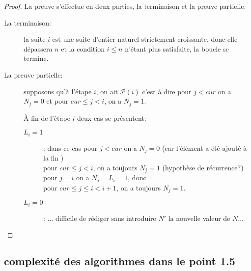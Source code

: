 \documentclass[10pt,french]{article}
\theoremstyle{plain}
\newtheorem*{proof}{Preuve}
\begin{document}
\begin{proof}
    La preuve s'effectue en deux parties, la terminaison et la preuve partielle.
    \begin{description}
        \item[La terminaison:]     la suite $i$ est une suite d'entier naturel strictement croissante, donc elle dépassera $n$ et la condition $i \leqslant n$   n'étant plus satisfaite, la boucle se termine.
        \item[La preuve partielle:] supposons qu'à l'étape $i$, on ait $\mathcal{P}(i)$ c'est à dire  pour $j < cur$ on a  $N_j=0$ et pour $cur \leqslant j<i$, on a  $N_j=1$.
        
        À fin de l'étape $i$ deux cas se présentent:
        \begin{description}
            \item [$L_i = 1$]  : dans ce cas pour  $j < cur$ on a  $N_j=0$ (car l'élément a été ajouté à la fin )\\
            pour $cur \leqslant j<i$, on a toujours $N_j=1$ (hypothèse de récurrence?) \\
            pour $j=i$ on a $N_j=L_i=1$, donc\\
            pour $cur \leqslant j\leqslant i <i+1$, on a toujours $N_j=1$.
            \item [$L_i = 0$] : ... difficile de rédiger sans introduire $N'$ la nouvelle valeur de $N$...
        \end{description}
    \end{description}




\end{proof}

\subsection{complexité des algorithmes dans le point 1.5}
\end{document}

